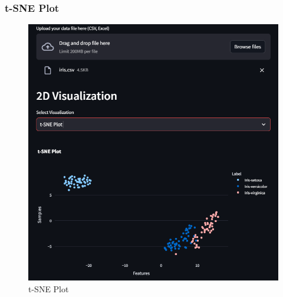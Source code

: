 \documentclass{article}
\begin{document}
\subsubsection{t-SNE Plot}
\begin{figure}[h!]
  \centering
  \includegraphics[width=0.6\textheight]{photos/t-sne.png}
  \caption{t-SNE Plot}
  \label{fig:TSNE Plot}
\end{figure}
\end{document}
